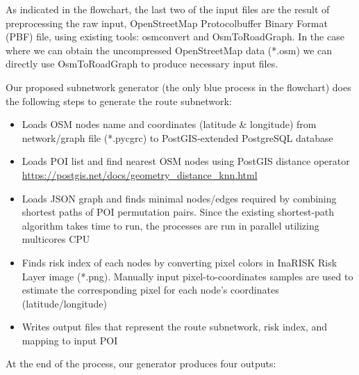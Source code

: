 \documentclass[conference]{IEEEtran}
\begin{document}
As indicated in the flowchart, the last two of the input files are the result of preprocessing the raw input, OpenStreetMap Protocolbuffer Binary Format (PBF) file, using existing tools: osmconvert\cite{OpenStreetMap2019OsmConvert} and OsmToRoadGraph\cite{Gemsa2017OsmToRoadGraph}. In the case where we can obtain the uncompressed OpenStreetMap data (*.osm) we can directly use OsmToRoadGraph to produce necessary input files.

Our proposed subnetwork generator (the only blue process in the flowchart) does the following steps to generate the route subnetwork:

\begin{itemize}


\item Loads OSM nodes name and coordinates (latitude \& longitude) from network/graph file (*.pycgrc) to PostGIS-extended PostgreSQL database

\item Loads POI list and find nearest OSM nodes using PostGIS distance operator \url{https://postgis.net/docs/geometry_distance_knn.html} 

\item Loads JSON graph and finds minimal nodes/edges required by combining shortest paths of POI permutation pairs. Since the existing shortest-path algorithm takes time to run, the processes are run in parallel utilizing multicores CPU

\item Finds risk index of each nodes by converting pixel colors in InaRISK Risk Layer image (*.png). Manually input pixel-to-coordinates samples are used to estimate the corresponding pixel for each node's coordinates (latitude/longitude)

\item Writes output files that represent the route subnetwork, risk index, and mapping to input POI

\end{itemize}

At the end of the process, our generator produces four outputs:
\end{document}
